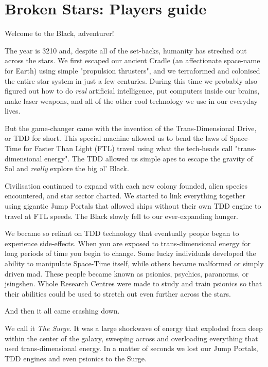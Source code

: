 \documentclass[10pt,twoside]{article}
\begin{document}
  \section*{Broken Stars: Players guide}

  \begin{multicols}{2}

  \addtocounter{section}{1}

  Welcome to the Black, adventurer! 
        
  The year is 3210 and, despite all of the set-backs, humanity has streched out across the stars. We first escaped our ancient Cradle (an affectionate space-name for Earth) using simple "propulsion thrusters", and we terraformed and colonised the entire star system in just a few centuries. During this time we probably also figured out how to do \textit{real} artificial intelligence, put computers inside our brains, make laser weapons, and all of the other cool technology we use in our everyday lives.
        
  But the game-changer came with the invention of the Trans-Dimensional Drive, or TDD for short. This special machine allowed us to bend the laws of Space-Time for Faster Than Light (FTL) travel using what the tech-heads call "trans-dimensional energy". The TDD allowed us simple apes to escape the gravity of Sol and \textit{really} explore the big ol' Black.

  Civilisation continued to expand with each new colony founded, alien species encountered, and star sector charted. We started to link everything together using gigantic Jump Portals that allowed ships without their own TDD engine to travel at FTL speeds. The Black slowly fell to our ever-expanding hunger.
  
  We became so reliant on TDD technology that eventually people began to experience side-effects. When you are exposed to trans-dimensional energy for long periods of time you begin to change. Some lucky individuals developed the ability to manipulate Space-Time itself, while others became malformed or simply driven mad. These people became known as psionics, psychics, paranorms, or jsingshen. Whole Research Centres were made to study and train psionics so that their abilities could be used to stretch out even further across the stars.

  And then it all came crashing down.
        
  We call it \textit{The Surge}. It was a large shockwave of energy that exploded from deep within the center of the galaxy, sweeping across and overloading everything that used trans-dimensional energy. In a matter of seconds we lost our Jump Portals, TDD engines and even psionics to the Surge.


\end{multicols}
\end{document}

